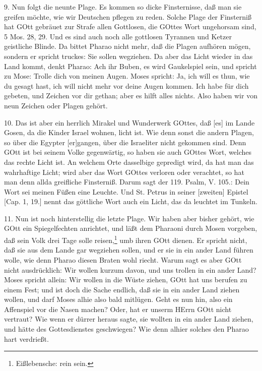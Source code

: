 9. Nun folgt die neunte Plage. Es kommen so dicke Finsternisse, daß man sie greifen möchte, wie wir Deutschen pflegen zu reden. Solche Plage der Finsterniß hat GOtt gebräuet zur Strafe allen Gottlosen, die GOttes Wort ungehorsam sind, 5 Mos. 28, 29. Und es sind auch noch alle gottlosen Tyrannen und Ketzer geistliche Blinde. Da bittet Pharao nicht mehr, daß die Plagen aufhören mögen, sondern er spricht truckes: Sie sollen wegziehen. Da aber das Licht wieder in das Land kommt, denkt Pharao: Ach ihr Buben, es wird Gaukelspiel sein, und spricht zu Mose: Trolle dich von meinen Augen. Moses spricht: Ja, ich will es thun, wie du gesagt hast, ich will nicht mehr vor deine Augen kommen. Ich habe für dich gebeten, und Zeichen vor dir gethan; aber es hilft alles nichts. Also haben wir von neun Zeichen oder Plagen gehört.

10. Das ist aber ein herrlich Mirakel und Wunderwerk GOttes, daß [es] im Lande Gosen, da die Kinder Israel wohnen, licht ist. Wie denn sonst die andern Plagen, so über die Egypter [er]gangen, über die Israeliter nicht gekommen sind. Denn GOtt ist bei seinem Volke gegenwärtig, so haben sie auch GOttes Wort, welches das rechte Licht ist. An welchem Orte dasselbige gepredigt wird, da hat man das wahrhaftige Licht; wird aber das Wort GOttes verloren oder verachtet, so hat man denn allda greifliche Finsterniß. Darum sagt der 119. Psalm, V. 105.: Dein Wort sei meinen Füßen eine Leuchte. Und St. Petrus in seiner [zweiten] Epistel [Cap. 1, 19.] nennt das göttliche Wort auch ein Licht, das da leuchtet im Tunkeln.

11. Nun ist noch hinterstellig die letzte Plage. Wir haben aber bisher gehört, wie GOtt ein Spiegelfechten anrichtet, und läßt dem Pharaoni durch Mosen vorgeben, daß sein Volk drei Tage solle reisen,\footnote{Eißlebensche: rein sein.} umb ihren GOtt dienen. Er spricht nicht, daß sie aus dem Lande gar wegziehen sollen, und er sie in ein ander Land führen wolle, wie denn Pharao diesen Braten wohl riecht. Warum sagt es aber GOtt nicht ausdrücklich: Wir wollen kurzum davon, und uns trollen in ein ander Land? Moses spricht allein: Wir wollen in die Wüste ziehen, GOtt hat uns berufen zu einem Fest; und ist doch die Sache endlich, daß sie in ein ander Land ziehen wollen, und darf Moses alhie also bald mitlügen. Geht es nun hin, also ein Affenspiel vor die Nasen machen? Oder, hat er unserm HErrn GOtt nicht vertraut? Wie wenn er dürrer heraus sagte, sie wollten in ein ander Land ziehen, und hätte des Gottesdienstes geschwiegen? Wie denn alhier solches den Pharao hart verdrießt.


